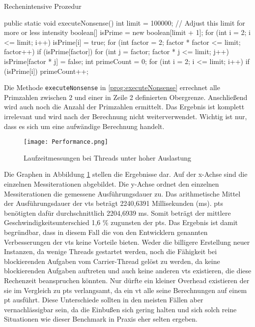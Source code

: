     \begin{program} [H]
        \caption{Rechenintensive Prozedur}
        \label{prog:executeNonsense}
    \begin{JavaCode}[language=Java, numbers=left]
public static void executeNonsense() {
    int limit = 100000; // Adjust this limit for more or less intensity
    boolean[] isPrime = new boolean[limit + 1];
    for (int i = 2; i <= limit; i++) 
        isPrime[i] = true;
    for (int factor = 2; factor * factor <= limit; factor++) {
        if (isPrime[factor]) {
            for (int j = factor; factor * j <= limit; j++) 
                isPrime[factor * j] = false;
        }
    }
    int primeCount = 0;
    for (int i = 2; i <= limit; i++) {
        if (isPrime[i])
            primeCount++;
    }
}\end{JavaCode}
    \end{program}

    Die Methode \texttt{executeNonsense} in \ref{prog:executeNonsense} errechnet alle Primzahlen zwischen 2 und einer in Zeile 2 definierten Obergrenze. Anschließend wird 
    auch noch die Anzahl der Primzahlen ermittelt. Das Ergebnis ist komplett irrelevant und wird nach der Berechnung nicht weiterverwendet. Wichtig ist nur, dass es sich um
    eine aufwändige Berechnung handelt.

    \begin{figure}[H]
        \centering
        \texttt{[image: Performance.png]}
        \caption{Laufzeitmessungen bei Threads unter hoher Auslastung}
        \label{fig:Performance}
    \end{figure}

    Die Graphen in Abbildung \ref{fig:Performance} stellen die Ergebnisse dar. Auf der x-Achse sind die einzelnen Messiterationen abgebildet. Die y-Achse ordnet den einzelnen Messiterationen die gemessene
    Ausführungsdauer zu.
    Das arithmetische Mittel der Ausführungsdauer der \Glspl{vt} beträgt 2240,6391 Millisekunden (ms). 
    \Glspl{pt} benötigten dafür durchschnittlich 2204,6939 ms. Somit beträgt der mittlere Geschwindigkeitsunterschied 1,6 \% zugunsten der \Glspl{pt}.
    Das Ergebnis ist damit begründbar, dass in diesem Fall die von den Entwicklern genannten Verbesserungen der \Glspl{vt} keine Vorteile bieten. Weder die billigere
    Erstellung neuer Instanzen, da wenige Threads gestartet werden, noch die Fähigkeit bei blockierenden Aufgaben vom Carrier-Thread gelöst zu werden, da keine blockierenden Aufgaben auftreten und
    auch keine anderen \Glspl{vt} existieren, die diese Rechenzeit beanspruchen könnten. Nur dürfte ein kleiner Overhead existieren der sie im Vergleich zu \Glspl{pt} verlangsamt, da ein \gls{vt} alle seine
    Berechnungen auf einem \gls{pt} ausführt.
    Diese Unterschiede sollten in den meisten Fällen aber vernachlässigbar sein, da die Einbußen sich gering halten und sich solch reine Situationen wie dieser Benchmark in Praxis eher selten 
    ergeben.



